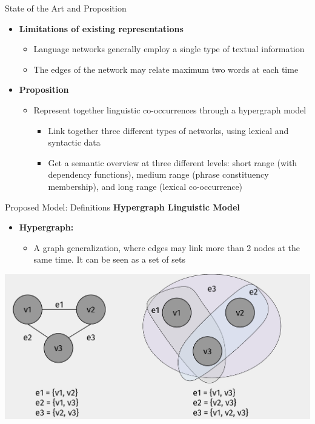 \documentclass[10pt,xcolor=table]{beamer}
\begin{document}
\begin{frame}{State of the Art and Proposition}
\begin{itemize}
\item \textbf{Limitations of existing representations}
	\begin{itemize}
	\item Language networks generally employ a single type of textual information
	\item The edges of the network may relate maximum two words at each time
	\end{itemize}
\item \textbf{Proposition}
	\begin{itemize}
	\item Represent together linguistic co-occurrences through a hypergraph model
	\begin{itemize}
	\item Link together three different types of networks, using lexical and syntactic data
	\item Get a semantic overview at three different levels: short range (with dependency functions), medium range (phrase constituency membership), and long range (lexical  co-occurrence) 
	\end{itemize}
	
	\end{itemize}
\end{itemize}
\vspace{\textheight}
\end{frame}

\begin{frame}{Proposed Model: Definitions}
\large \textbf{Hypergraph Linguistic Model}
\begin{itemize}
	
	\item \textbf{Hypergraph:}
	\begin{itemize}
		\item A graph generalization, where edges may link more than 2 nodes at the same time. It can be seen as a set of sets
	\end{itemize}

\end{itemize}
\centering
\includegraphics[width=1\linewidth]{image2/Chapitre3/graph_vs_hgraph.pdf}
\vspace{\textheight}
\end{frame}
\end{document}
